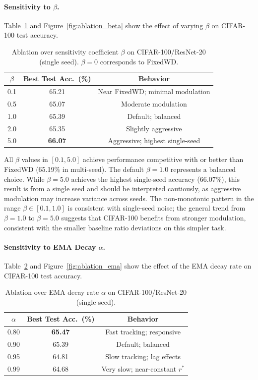 \documentclass{article}
\begin{document}
\paragraph{Sensitivity to $\beta$.}
Table~\ref{tab:ablation_beta} and Figure~\ref{fig:ablation_beta} show the effect of
varying $\beta$ on CIFAR-100 test accuracy.

\begin{table}[t]
\centering
\caption{Ablation over sensitivity coefficient $\beta$ on CIFAR-100/ResNet-20 (single seed). $\beta = 0$ corresponds to FixedWD.}
\label{tab:ablation_beta}
\small
\begin{tabular}{ccc}
\toprule
$\beta$ & Best Test Acc.\ (\%) & Behavior \\
\midrule
0.1 & 65.21 & Near FixedWD; minimal modulation \\
0.5 & 65.07 & Moderate modulation \\
1.0 & 65.39 & Default; balanced \\
2.0 & 65.35 & Slightly aggressive \\
5.0 & \textbf{66.07} & Aggressive; highest single-seed \\
\bottomrule
\end{tabular}
\end{table}

All $\beta$ values in $[0.1, 5.0]$ achieve performance competitive
with or better than FixedWD (65.19\% in multi-seed). The default
$\beta = 1.0$ represents a balanced choice. While $\beta = 5.0$
achieves the highest single-seed accuracy (66.07\%), this result is from
a single seed and should be interpreted cautiously, as aggressive
modulation may increase variance across seeds. The non-monotonic pattern
in the range $\beta \in [0.1, 1.0]$ is consistent with single-seed
noise; the general trend from $\beta = 1.0$ to $\beta = 5.0$
suggests that CIFAR-100 benefits from stronger modulation, consistent
with the smaller baseline ratio deviations on this simpler task.

\paragraph{Sensitivity to EMA Decay $\alpha$.}
Table~\ref{tab:ablation_ema} and Figure~\ref{fig:ablation_ema} show the effect of the EMA
decay rate on CIFAR-100 test accuracy.

\begin{table}[t]
\centering
\caption{Ablation over EMA decay rate $\alpha$ on CIFAR-100/ResNet-20 (single seed).}
\label{tab:ablation_ema}
\small
\begin{tabular}{ccc}
\toprule
$\alpha$ & Best Test Acc.\ (\%) & Behavior \\
\midrule
0.80 & \textbf{65.47} & Fast tracking; responsive \\
0.90 & 65.39 & Default; balanced \\
0.95 & 64.81 & Slow tracking; lag effects \\
0.99 & 64.68 & Very slow; near-constant $r^*$ \\
\bottomrule
\end{tabular}
\end{table}
\end{document}

